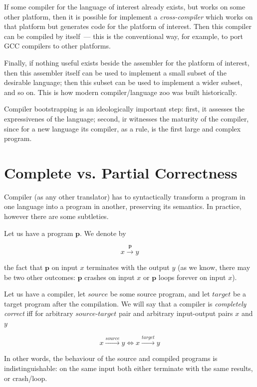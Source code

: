 \documentclass{book}
\newcommand{\primi}[1]{\mathbf{#1}}
\newcommand{\sys}[1]{\textsc{#1}}
\begin{document}
If some compiler for the language of interest already exists, but works on some other platform, then it is possible for
implement a \emph{cross-compiler} which works on that platform but generates code for the platform of interest. Then
this compiler can be compiled by itself~--- this is the conventional way, for example, to port \sys{GCC} compilers
to other platforms.

Finally, if nothing useful exists beside the assembler for the platform of interest, then this assembler itself can be
used to implement a small subset of the desirable language; then this subset can be used to implement a wider subset, and so on.
This is how modern compiler/language zoo was built historically.

Compiler bootstrapping is an ideologically important step: first, it assesses the expressivenes of the language; second, ir witnesses the
maturity of the compiler, since for a new language its compiler, as a rule, is the first large and complex program.

\section{Complete vs. Partial Correctness}

Compiler (as any other translator) has to syntactically transform a program in one language into a program in another, preserving its semantics.
In practice, however there are some subtleties.

Let us have a program $\primi{p}$. We denote by

\[
x\xrightarrow{\displaystyle{\primi{p}}} y
\]

the fact that $\primi{p}$ on input $x$ terminates with the output $y$ (as we know, there may be two other outcomes: $\primi{p}$ crashes on input $x$ or
$\primi{p}$ loops forever on input $x$). 

Let us have a compiler, let $source$ be some source program, and let $target$ be a target program after the compilation.
We will say that a compiler is \emph{completely correct} iff for arbitrary $source$-$target$ pair and arbitrary
input-output pairs $x$ and $y$

\[
x\xrightarrow{\displaystyle{source}}y \Longleftrightarrow x\xrightarrow{\displaystyle{target}}y
\]

In other words, the behaviour of the source and compiled programs is indistinguishable: on the same input both either
terminate with the same results, or crash/loop.
\end{document}
